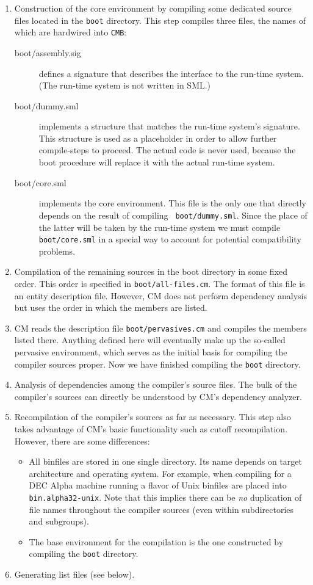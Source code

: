 \documentclass{article}
\begin{document}
\begin{enumerate}
\item Construction of the core environment by compiling some
dedicated source files located in the {\tt boot} directory.
This step compiles three files, the names of which
are hardwired into {\tt CMB}:

\begin{description}
\item[boot/assembly.sig] defines a signature that describes the
interface to the run-time system. (The run-time system is not written
in SML.)
\item[boot/dummy.sml] implements a structure that matches the
run-time system's signature.  This structure is used as a placeholder
in order to allow further compile-steps to proceed.  The actual code
is never used, because the boot procedure will replace it with the
actual run-time system.
\item[boot/core.sml] implements the core environment.  This file
is the only one that directly depends on the result of compiling {\tt
boot/dummy.sml}.  Since the place of the latter will be taken by the
run-time system we must compile {\tt boot/core.sml} in a special way
to account for potential compatibility problems.
\end{description}

\item Compilation of the remaining sources in the boot directory in
some fixed order. This order is specified in {\tt boot/all-files.cm}.
The format of this file is an entity description file. However, CM
does not perform dependency analysis but uses the order in which the
members are listed.
\item CM reads the description file {\tt boot/pervasives.cm} and
compiles the members listed there.  Anything defined here will
eventually make up the so-called pervasive environment, which serves
as the initial basis for compiling the compiler sources proper.
Now we have finished compiling the {\tt boot} directory.
\item Analysis of dependencies among the compiler's source files.  The
bulk of the compiler's sources can directly be understood by CM's
dependency analyzer.
\item Recompilation of the compiler's sources as far as necessary.
This step also takes advantage of CM's basic functionality such as
cutoff recompilation. However, there are some differences:
\begin{itemize}
\item All binfiles are stored in one single directory. Its name
depends on target architecture and operating system.  For example,
when compiling for a DEC Alpha machine running a flavor of Unix
binfiles are placed into {\tt bin.alpha32-unix}. Note that this
implies there can be {\em no} duplication of file names throughout the
compiler sources (even within subdirectories and subgroups).
\item The base environment for the compilation is the one constructed
by compiling the {\tt boot} directory.
\end{itemize}
\item Generating list files (see below).
\label{step:list}
\end{enumerate}
\end{document}
